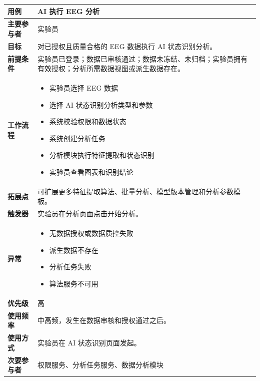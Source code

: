 \begin{table}[H]
    \centering
    \begin{tabular}{|p{3cm}|p{11.5cm}|}
        \hline
        \textbf{用例} & AI 执行 EEG 分析 \\
        \hline
        \textbf{主要参与者} & 实验员 \\
        \hline
        \textbf{目标} & 对已授权且质量合格的 EEG 数据执行 AI 状态识别分析。 \\
        \hline
        \textbf{前提条件} & 实验员已登录；数据已审核通过；数据未冻结、未归档；实验员拥有有效授权；分析所需数据视图或派生数据存在。 \\
        \hline
        \textbf{工作流程} &
        \vspace{-0.3cm}
        \begin{itemize}
            \item 实验员选择 EEG 数据
            \item 选择 AI 状态识别分析类型和参数
            \item 系统校验权限和数据状态
            \item 系统创建分析任务
            \item 分析模块执行特征提取和状态识别
            \item 实验员查看图表和识别结论
        \end{itemize} \vspace{-0.3cm} \\
        \hline
        \textbf{拓展点} & 可扩展更多特征提取算法、批量分析、模型版本管理和分析参数模板。 \\
        \hline
        \textbf{触发器} & 实验员在分析页面点击开始分析。 \\
        \hline
        \textbf{异常} &
        \vspace{-0.3cm}
        \begin{itemize}
            \item 无数据授权或数据质控失败
            \item 派生数据不存在
            \item 分析任务失败
            \item 算法服务不可用
        \end{itemize} \vspace{-0.3cm} \\
        \hline
        \textbf{优先级} & 高 \\
        \hline
        \textbf{使用频率} & 中高频，发生在数据审核和授权通过之后。 \\
        \hline
        \textbf{使用方式} & 实验员在 AI 状态识别页面发起。 \\
        \hline
        \textbf{次要参与者} & 权限服务、分析任务服务、数据分析模块 \\
        \hline
    \end{tabular}
\end{table}


